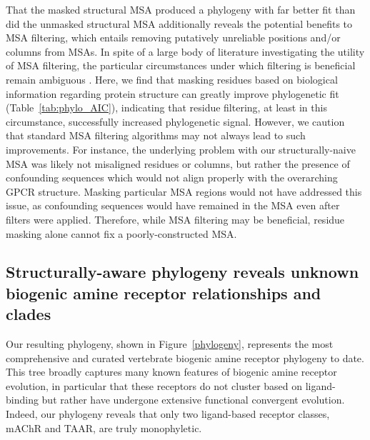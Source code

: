 \documentclass[fleqn,10pt]{wlpeerj}
\begin{document}
That the masked structural MSA produced a phylogeny with far better fit than did the unmasked structural MSA additionally reveals the potential benefits to MSA filtering, which entails removing putatively unreliable positions and/or columns from MSAs. In spite of a large body of literature investigating the utility of MSA filtering, the particular circumstances under which filtering is beneficial remain ambiguous \citep{Castresana2000,Talavera2007,Schloss2010,Penn2010,Jordan2012,Privman2012,Wu2012,SpielmanDawsonWilke2014}. Here, we find that masking residues based on biological information regarding protein structure can greatly improve phylogenetic fit (Table~\ref{tab:phylo_AIC}), indicating that residue filtering, at least in this circumstance, successfully increased phylogenetic signal. However, we caution that standard MSA filtering algorithms may not always lead to such improvements. For instance, the underlying problem with our structurally-naive MSA was likely not misaligned residues or columns, but rather the presence of confounding sequences which would not align properly with the overarching GPCR structure. Masking particular MSA regions would not have addressed this issue, as confounding sequences would have remained in the MSA even after filters were applied. Therefore, while MSA filtering may be beneficial, residue masking alone cannot fix a poorly-constructed MSA. 



\subsection*{Structurally-aware phylogeny reveals unknown biogenic amine receptor relationships and clades}

Our resulting phylogeny, shown in Figure~\ref{phylogeny}, represents the most comprehensive and curated vertebrate biogenic amine receptor phylogeny to date. This tree broadly captures many known features of biogenic amine receptor evolution, in particular that these receptors do not cluster based on ligand-binding but rather have undergone extensive functional convergent evolution. Indeed, our phylogeny reveals that only two ligand-based receptor classes, mAChR and TAAR, are truly monophyletic. 
\end{document}
